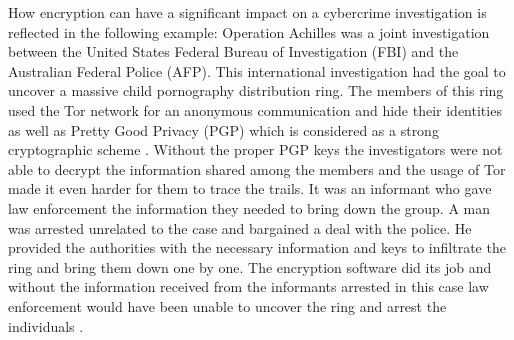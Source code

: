 \documentclass[a4paper, 11pt]{article}
\begin{document}
\par How encryption can have a significant impact on a cybercrime investigation is reflected in the following example: Operation Achilles was a joint investigation between the United States Federal Bureau of Investigation (FBI) and the Australian Federal Police (AFP). This international investigation had the goal to uncover a massive child pornography distribution ring. The members of this ring used the Tor network for an anonymous communication and hide their identities as well as Pretty Good Privacy (PGP) which is considered as a strong cryptographic scheme \cite{STRONGCRYPTO}. Without the proper PGP keys the investigators were not able to decrypt the information shared among the members and the usage of Tor made it even harder for them to trace the trails. It was an informant who gave law enforcement the information they needed to bring down the group. A man was arrested unrelated to the case and bargained a deal with the police. He provided the authorities with the necessary information and keys to infiltrate the ring and bring them down one by one. The encryption software did its job and without the information received from the informants arrested in this case law enforcement would have been unable to uncover the ring and arrest the individuals \cite{ACHILLES}\cite{FBIACHILLES}.
\end{document}
